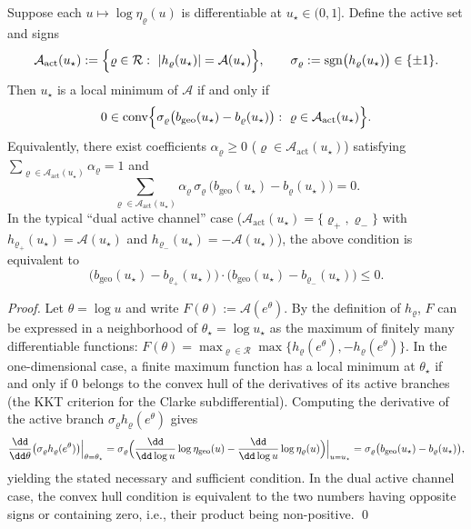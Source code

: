 \begin{theorem}\label{thm:gut-A-local-optimality}
Suppose each \(u\mapsto \log\eta_\varrho(u)\) is differentiable at \(u_\star\in(0,1]\).
Define the active set and signs
\[
\mathcal{A}_{\mathrm{act}}(u_\star):=\Bigl\{\varrho\in\mathcal{R}:\ |h_\varrho(u_\star)|=\mathcal{A}(u_\star)\Bigr\},
\qquad
\sigma_\varrho:=\operatorname{sgn}\bigl(h_\varrho(u_\star)\bigr)\in\{\pm 1\}.
\]
Then \(u_\star\) is a local minimum of \(\mathcal{A}\) if and only if
\[
0\in
\operatorname{conv}\Bigl\{\sigma_\varrho\bigl(b_{\mathrm{geo}}(u_\star)-b_\varrho(u_\star)\bigr):\ \varrho\in\mathcal{A}_{\mathrm{act}}(u_\star)\Bigr\}.
\]
Equivalently, there exist coefficients \(\alpha_\varrho\ge 0\) (\(\varrho\in\mathcal{A}_{\mathrm{act}}(u_\star)\)) satisfying
\(
\sum_{\varrho\in\mathcal{A}_{\mathrm{act}}(u_\star)}\alpha_\varrho=1
\)
and
\[
\sum_{\varrho\in\mathcal{A}_{\mathrm{act}}(u_\star)}
\alpha_\varrho\,\sigma_\varrho\,\bigl(b_{\mathrm{geo}}(u_\star)-b_\varrho(u_\star)\bigr)=0.
\]
In the typical ``dual active channel'' case (\(\mathcal{A}_{\mathrm{act}}(u_\star)=\{\varrho_+,\varrho_-\}\) with \(h_{\varrho_+}(u_\star)=\mathcal{A}(u_\star)\) and \(h_{\varrho_-}(u_\star)=-\mathcal{A}(u_\star)\)), the above condition is equivalent to
\[
\bigl(b_{\mathrm{geo}}(u_\star)-b_{\varrho_+}(u_\star)\bigr)\cdot
\bigl(b_{\mathrm{geo}}(u_\star)-b_{\varrho_-}(u_\star)\bigr)\le 0.
\]
\end{theorem}

\begin{proof}
Let \(\theta=\log u\) and write \(F(\theta):=\mathcal{A}(e^\theta)\).
By the definition of \(h_\varrho\), \(F\) can be expressed in a neighborhood of \(\theta_\star=\log u_\star\) as the maximum of finitely many differentiable functions:
\(
F(\theta)=\max_{\varrho\in\mathcal{R}}\max\{h_\varrho(e^\theta),-h_\varrho(e^\theta)\}.
\)
In the one-dimensional case, a finite maximum function has a local minimum at \(\theta_\star\) if and only if \(0\) belongs to the convex hull of the derivatives of its active branches (the KKT criterion for the Clarke subdifferential).
Computing the derivative of the active branch \(\sigma_\varrho h_\varrho(e^\theta)\) gives
\[
\frac{\dd}{\dd\theta}\bigl(\sigma_\varrho h_\varrho(e^\theta)\bigr)\Big|_{\theta=\theta_\star}
=\sigma_\varrho\Bigl(\frac{\dd}{\dd\log u}\log\eta_{\mathrm{geo}}(u)-\frac{\dd}{\dd\log u}\log\eta_\varrho(u)\Bigr)\Big|_{u=u_\star}
=\sigma_\varrho\bigl(b_{\mathrm{geo}}(u_\star)-b_\varrho(u_\star)\bigr),
\]
yielding the stated necessary and sufficient condition. In the dual active channel case, the convex hull condition is equivalent to the two numbers having opposite signs or containing zero, i.e., their product being non-positive. \qed
\end{proof}


